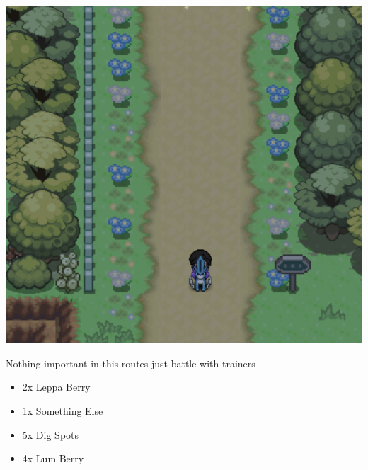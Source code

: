 \documentclass[11pt]{article}
\begin{document}
\includegraphics[width=\textwidth]{walkthrough/Sinnoh/Route_209}

Nothing important in this routes just battle with trainers


\begin{itemize}
    \item 2x Leppa Berry
    \item 1x Something Else
    \item 5x Dig Spots
    \item 4x Lum Berry
\end{itemize}




\end{document}
